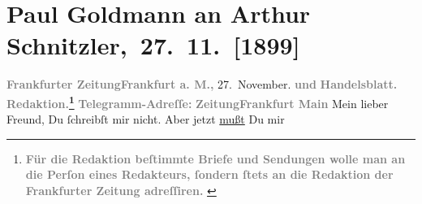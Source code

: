 

         
         \renewcommand{\erwaehntePersonen}{Personen: Theodore Rottenberg, Gertrud Rottenberg, Ludwig Rottenberg}
         \renewcommand{\erwaehnteInstitutionen}{Institutionen: Frankfurter Zeitung}
         \renewcommand{\erwaehnteOrte}{Orte: Frankfurt am Main, Wien}
         \renewcommand{\erwaehnteWerke}{}
               \section[ Paul Goldmann an Arthur Schnitzler, 27. 11. {[}1899{]}]{ Paul Goldmann an Arthur Schnitzler, 27. 11. {[}1899{]}}\nopagebreak{}\rehead{ }\begin{ledgroupsized}[t]{13cm}\normalsize\beginnumbering \toendnotes[C]{\smallbreak\pagebreak[2]} 
\toendnotes[C]{\smallbreak}\pstart
           \noindent{}{\pb}\textcolor{gray}{\textbf{\textbf{Frankfurter Zeitung}}}\hfill \textcolor{gray}{\textbf{\textbf{Frankfurt a. M.,}}}{ }27. November.\pend
           \pstart
           \textcolor{gray}{\textbf{und}}\pend
           \pstart
           \textcolor{gray}{\textbf{Handelsblatt.}}\pend
           \pstart
           \textcolor{gray}{\textbf{\textbf{Redaktion.}\footnote{\noindent{}\textcolor{gray}{\textbf{Für die Redaktion beſtimmte Briefe und Sendungen wolle man
                                  an die Perſon eines Redakteurs,
                              ſondern ſtets \textbf{an die Redaktion der Frankfurter Zeitung} adreſſiren. }}}}}\pend
           \pstart
           \textcolor{gray}{\textbf{Telegramm-Adreſſe:}}\pend
           \pstart
           \textcolor{gray}{\textbf{\textbf{ZeitungFrankfurt Main}}}\pend
           \pstart{}Mein lieber Freund,\pend\pstart
           Du ſchreibſt mir nicht. Aber jetzt \uline{mußt} Du mir

\end{ledgroupsized}
